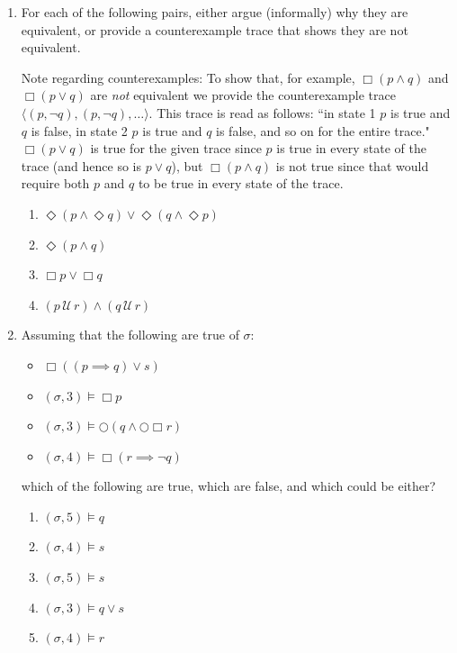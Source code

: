\documentclass{article}
\newcommand{\Until}{\,\mathcal{U}\,}
\newcommand{\Next}{\bigcirc}
\begin{document}

\begin{enumerate}
\item For each of the following pairs, either argue (informally) why they are equivalent, or provide a counterexample trace that shows they are not equivalent.

    {\sc Note} regarding counterexamples: To show that, for example, $\Box (p \land q)$ and $\Box (p \lor q)$ are {\em not} equivalent we provide the counterexample trace $\langle (p,\neg q), (p,\neg q), \ldots \rangle$. This trace is read as follows: ``in state 1 $p$ is true and $q$ is false, in state 2 $p$ is true and $q$ is false, and so on for the entire trace." $\Box (p \lor q)$ is true for the given trace since $p$ is true in every state of the trace (and hence so is $p \lor q$), but $\Box (p \land q)$ is not true since that would require both $p$ and $q$ to be true in every state of the trace.
\begin{enumerate}
\item {}   $\Diamond(p\land\Diamond q)\lor\Diamond(q\land\Diamond p)$
\item {}  $\Diamond(p\land q)$
\item {} $\Box p \lor \Box q$
\item \makebox[1.5in][l]{$(p\land q)\Until r$} $(p\Until r)\land (q\Until r)$
\end{enumerate}
\item Assuming that the following are true of $\sigma$:
\begin{itemize}
\item $\Box((p\implies q)\lor s)$
\item $(\sigma,3)\models\Box p $
\item $(\sigma,3)\models\Next(q\land\Next\Box r) $
\item $(\sigma,4)\models\Box(r\implies\neg q) $
\end{itemize}
which of the following are true, which are false, and which could be either?
\begin{enumerate}
\item $(\sigma,5)\models q$
\item $(\sigma,4)\models s$
\item $(\sigma,5)\models s$
\item $(\sigma,3)\models q\lor s$
\item $(\sigma,4)\models r$
\end{enumerate}



\end{enumerate}
\end{document}
